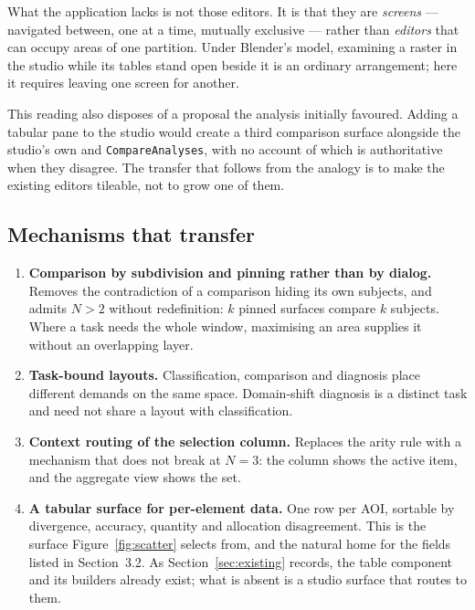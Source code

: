\documentclass[11pt,a4paper]{article}
\newcommand{\code}[1]{\texttt{\small #1}}
\begin{document}
What the application lacks is not those editors. It is that they are
\emph{screens} --- navigated between, one at a time, mutually exclusive ---
rather than \emph{editors} that can occupy areas of one partition. Under
Blender's model, examining a raster in the studio while its tables stand open
beside it is an ordinary arrangement; here it requires leaving one screen for
another.

This reading also disposes of a proposal the analysis initially favoured.
Adding a tabular pane to the studio would create a third comparison surface
alongside the studio's own and \code{CompareAnalyses}, with no account of which
is authoritative when they disagree. The transfer that follows from the analogy
is to make the existing editors tileable, not to grow one of them.

\subsection{Mechanisms that transfer}
\label{sec:transfers}

\begin{enumerate}
\item \textbf{Comparison by subdivision and pinning rather than by dialog.}
      Removes the contradiction of a comparison hiding its own subjects, and
      admits $N > 2$ without redefinition: $k$ pinned surfaces compare $k$
      subjects. Where a task needs the whole window, maximising an area supplies
      it without an overlapping layer.
\item \textbf{Task-bound layouts.} Classification, comparison and diagnosis
      place different demands on the same space. Domain-shift diagnosis is a
      distinct task and need not share a layout with classification.
\item \textbf{Context routing of the selection column.} Replaces the arity rule
      with a mechanism that does not break at $N = 3$: the column shows the
      active item, and the aggregate view shows the set.
\item \textbf{A tabular surface for per-element data.} One row per AOI, sortable
      by divergence, accuracy, quantity and allocation disagreement. This is the
      surface Figure~\ref{fig:scatter} selects from, and the natural home for
      the fields listed in Section~3.2. As Section~\ref{sec:existing} records,
      the table component and its builders already exist; what is absent is a
      studio surface that routes to them.
\end{enumerate}
\end{document}
